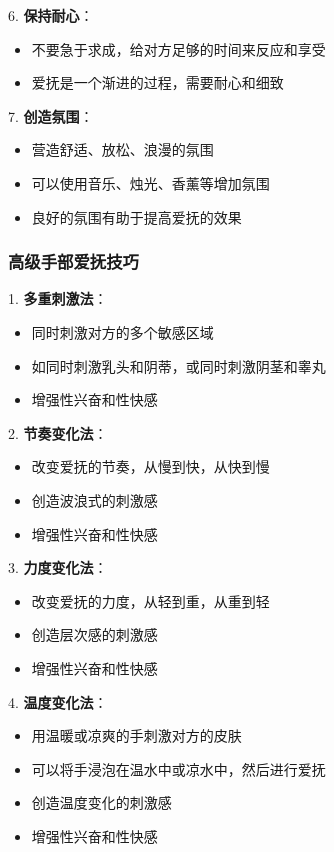 \documentclass[12pt,UTF8]{ctexbook}
\begin{document}
6. \textbf{保持耐心}：
  \begin{itemize}
  \item 不要急于求成，给对方足够的时间来反应和享受
  \item 爱抚是一个渐进的过程，需要耐心和细致
  \end{itemize}

7. \textbf{创造氛围}：
  \begin{itemize}
  \item 营造舒适、放松、浪漫的氛围
  \item 可以使用音乐、烛光、香薰等增加氛围
  \item 良好的氛围有助于提高爱抚的效果
  \end{itemize}

\subsubsection{高级手部爱抚技巧}

1. \textbf{多重刺激法}：
  \begin{itemize}
  \item 同时刺激对方的多个敏感区域
  \item 如同时刺激乳头和阴蒂，或同时刺激阴茎和睾丸
  \item 增强性兴奋和性快感
  \end{itemize}

2. \textbf{节奏变化法}：
  \begin{itemize}
  \item 改变爱抚的节奏，从慢到快，从快到慢
  \item 创造波浪式的刺激感
  \item 增强性兴奋和性快感
  \end{itemize}

3. \textbf{力度变化法}：
  \begin{itemize}
  \item 改变爱抚的力度，从轻到重，从重到轻
  \item 创造层次感的刺激感
  \item 增强性兴奋和性快感
  \end{itemize}

4. \textbf{温度变化法}：
  \begin{itemize}
  \item 用温暖或凉爽的手刺激对方的皮肤
  \item 可以将手浸泡在温水中或凉水中，然后进行爱抚
  \item 创造温度变化的刺激感
  \item 增强性兴奋和性快感
  \end{itemize}
\end{document}
